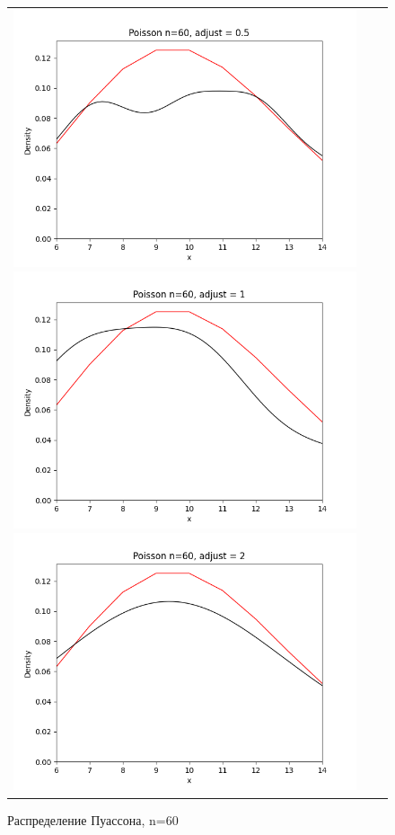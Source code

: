 \begin{figure}[H]
	\begin{tabular}{ccc}
		\includegraphics[scale=0.33]{poisson_n60_adjust0.5.png}
		\includegraphics[scale=0.33]{poisson_n60_adjust1.png}
		\includegraphics[scale=0.33]{poisson_n60_adjust2.png}
	\end{tabular}
	\caption{Распределение Пуассона, n=60}
\end{figure}

